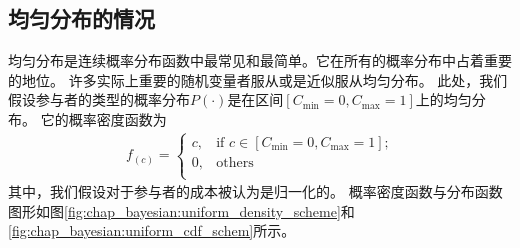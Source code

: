 \subsection{均匀分布的情况}
均匀分布是连续概率分布函数中最常见和最简单。它在所有的概率分布中占着重要的地位。
许多实际上重要的随机变量者服从或是近似服从均匀分布。
此处，我们假设参与者的类型的概率分布$P(\cdot)$是在区间$[C_{\min}=0, C_{\max}=1]$上的均匀分布。
它的概率密度函数为
\begin{align}
    f_(c) = \begin{cases} c, &\text{if $c \in [C_{\min}=0, C_{\max}=1]$;}\\
        0, &\text{others}\\ 
    \end{cases} 
    \label{eqn_equilibrium_prob} 
\end{align}
其中，我们假设对于参与者的成本被认为是归一化的。
概率密度函数与分布函数图形如图\ref{fig:chap_bayesian:uniform_density_scheme}和\ref{fig:chap_bayesian:uniform_cdf_schem}所示。

